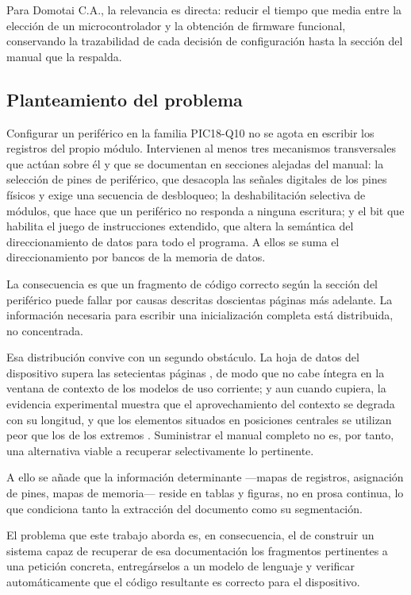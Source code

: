 Para Domotai C.A., la relevancia es directa: reducir el tiempo que media entre
la elección de un microcontrolador y la obtención de firmware funcional,
conservando la trazabilidad de cada decisión de configuración hasta la sección
del manual que la respalda.

\subsection*{Planteamiento del problema}

Configurar un periférico en la familia PIC18-Q10 no se agota en escribir los
registros del propio módulo. Intervienen al menos tres mecanismos transversales
que actúan sobre él y que se documentan en secciones alejadas del manual: la
selección de pines de periférico, que desacopla las señales digitales de los
pines físicos y exige una secuencia de desbloqueo; la deshabilitación selectiva
de módulos, que hace que un periférico no responda a ninguna escritura; y el bit
que habilita el juego de instrucciones extendido, que altera la semántica del
direccionamiento de datos para todo el programa. A ellos se suma el
direccionamiento por bancos de la memoria de datos.

La consecuencia es que un fragmento de código correcto según la sección del
periférico puede fallar por causas descritas doscientas páginas más adelante. La
información necesaria para escribir una inicialización completa está
distribuida, no concentrada.

Esa distribución convive con un segundo obstáculo. La hoja de datos del
dispositivo supera las setecientas páginas \cite{microchip2024ds40002043}, de
modo que no cabe íntegra en la ventana de contexto de los modelos de uso
corriente; y aun cuando cupiera, la evidencia experimental muestra que el
aprovechamiento del contexto se degrada con su longitud, y que los elementos
situados en posiciones centrales se utilizan peor que los de los extremos
\cite{liu2024lost}. Suministrar el manual completo no es, por tanto, una
alternativa viable a recuperar selectivamente lo pertinente.

A ello se añade que la información determinante —mapas de registros, asignación
de pines, mapas de memoria— reside en tablas y figuras, no en prosa continua, lo
que condiciona tanto la extracción del documento como su segmentación.

El problema que este trabajo aborda es, en consecuencia, el de construir un
sistema capaz de recuperar de esa documentación los fragmentos pertinentes a una
petición concreta, entregárselos a un modelo de lenguaje y verificar
automáticamente que el código resultante es correcto para el dispositivo.

